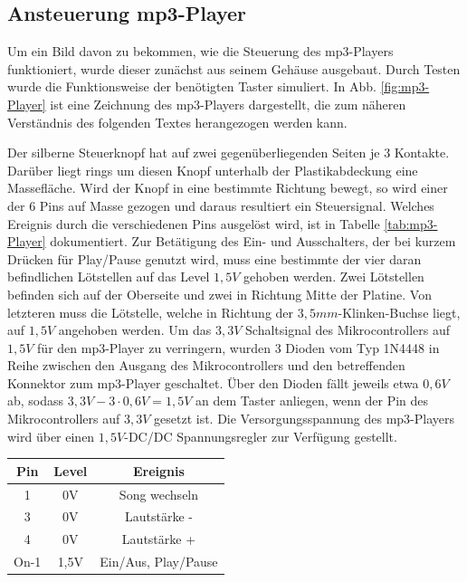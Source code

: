 \documentclass[journal, a4paper]{IEEEtran}
\begin{document}
	\subsection{Ansteuerung mp3-Player}
		\label{sc:Hardware:subsc:mp3-Player}
		Um ein Bild davon zu bekommen, wie die Steuerung des mp3-Players funktioniert, wurde dieser zunächst aus seinem Gehäuse ausgebaut. Durch Testen wurde die Funktionsweise der benötigten Taster simuliert.  In Abb. \ref{fig:mp3-Player} ist eine Zeichnung des mp3-Players dargestellt, die zum näheren Verständnis des folgenden Textes herangezogen werden kann.\par 
		Der silberne Steuerknopf hat auf zwei gegenüberliegenden Seiten je 3 Kontakte. Darüber liegt rings um diesen Knopf unterhalb der Plastikabdeckung eine Massefläche. Wird der Knopf in eine bestimmte Richtung bewegt, so wird einer der 6 Pins auf Masse gezogen und daraus resultiert ein Steuersignal. Welches Ereignis durch die  verschiedenen Pins ausgelöst wird, ist in Tabelle \ref{tab:mp3-Player} dokumentiert. Zur Betätigung des Ein- und Ausschalters, der bei kurzem Drücken für Play/Pause genutzt wird, muss eine bestimmte der vier daran befindlichen Lötstellen auf das Level $1,5V$ gehoben werden. Zwei Lötstellen befinden sich auf der Oberseite und zwei in Richtung Mitte der Platine. Von letzteren muss die Lötstelle, welche in Richtung der $3,5mm$-Klinken-Buchse liegt, auf $1,5V$ angehoben werden. Um das $3,3V$ Schaltsignal des Mikrocontrollers auf $1,5V$ für den mp3-Player zu verringern, wurden 3 Dioden vom Typ 1N4448 in Reihe zwischen den Ausgang des Mikrocontrollers und den betreffenden Konnektor zum mp3-Player geschaltet. Über den Dioden fällt jeweils etwa $0,6V$ ab, sodass $3,3V-3\cdot0,6V = 1,5V$ an dem Taster anliegen, wenn der Pin des Mikrocontrollers auf $3,3V$ gesetzt ist. Die Versorgungsspannung des mp3-Players wird über einen $1,5V$-DC/DC Spannungsregler zur Verfügung gestellt.
		\begin{center}
			\begin{tabular}{ccc}
				\toprule
				Pin  &  Level & Ereignis \\
				\midrule
				1 & 0V & Song wechseln\\
				3 & 0V & Lautstärke -\\
				4 & 0V & Lautstärke +\\
				On-1 & 1,5V & Ein/Aus, Play/Pause\\
				\bottomrule		
			\end{tabular}
			\label{tab:mp3-Player}
		\end{center}
\end{document}
